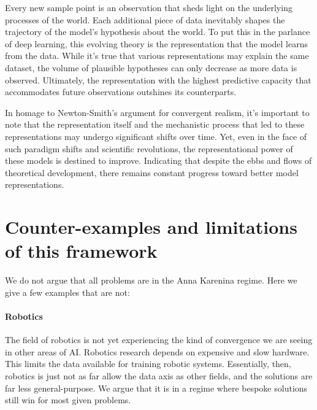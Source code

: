 \documentclass{article}
\theoremstyle{plain}
\theoremstyle{definition}
\theoremstyle{remark}
\begin{document}


Every new sample point is an observation that sheds light on the underlying processes of the world. Each additional piece of data inevitably shapes the trajectory of the model's hypothesis about the world. To put this in the parlance of deep learning, this evolving theory is the representation that the model learns from the data.
While it's true that various representations may explain the same dataset, the volume of plausible hypotheses can only decrease as more data is observed. Ultimately, the representation with the highest predictive capacity that accommodates future observations outshines its counterparts.

In homage to Newton-Smith's argument for convergent realism, it's important to note that the representation itself and the mechanistic process that led to these representations may undergo significant shifts over time. Yet, even in the face of such paradigm shifts and scientific revolutions, the representational power of these models is destined to improve. Indicating that despite the ebbs and flows of theoretical development, there remains constant progress toward better model representations.



\section{Counter-examples and limitations of this framework}

We do not argue that all problems are in the Anna Karenina regime. Here we give a few examples that are not:

\paragraph{Robotics} The field of robotics is not yet experiencing the kind of convergence we are seeing in other areas of AI. Robotics research depends on expensive and slow hardware. This limits the data available for training robotic systems. Essentially, then, robotics is just not as far allow the data axis as other fields, and the solutions are far less general-purpose. We argue that it is in a regime where bespoke solutions still win for most given problems. 
\end{document}
